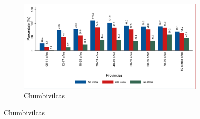\documentclass[12pt,a4paper,openany]{book}
\begin{document}
\begin{figure}[h]
		\vspace{3mm}
		\begin{subfigure}[b]{0.63\textwidth}
			\centering
			\includegraphics[width=\textwidth]{../figuras/vacunacion__provincias_6.pdf}
			\caption{Chumbivilcas}
		\end{subfigure}
	\end{figure}
	
\end{document}
